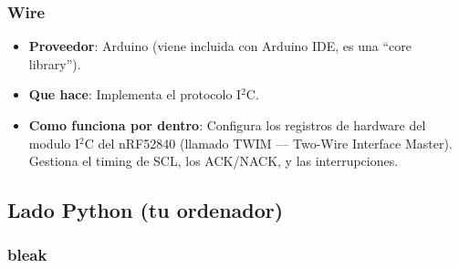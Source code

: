 \documentclass[11pt,a4paper]{article}
\begin{document}
\subsubsection{Wire}

\begin{itemize}
    \item \textbf{Proveedor}: Arduino (viene incluida con Arduino
          IDE, es una ``core library'').
    \item \textbf{Que hace}: Implementa el protocolo I$^2$C.
    \item \textbf{Como funciona por dentro}: Configura los registros
          de hardware del modulo I$^2$C del nRF52840 (llamado TWIM
          --- Two-Wire Interface Master). Gestiona el timing de SCL,
          los ACK/NACK, y las interrupciones.
\end{itemize}

\subsection{Lado Python (tu ordenador)}

\subsubsection{bleak}
\end{document}
